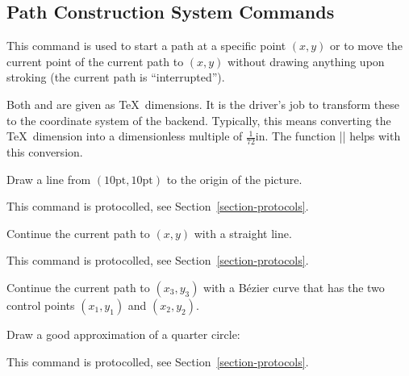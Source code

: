 \subsection{Path Construction System Commands}

\begin{command}{\pgfsys@moveto{}}
  This command is used to start a path at a specific point
  $(x,y)$ or to move the current point of the current path to  $(x,y)$
  without drawing anything upon stroking (the current path is
  ``interrupted'').

  Both  and  are given as \TeX\ dimensions. It is the
  driver's job to transform these to the coordinate system of the
  backend. Typically, this means converting the \TeX\ dimension into a
  dimensionless multiple of $\frac{1}{72}\mathrm{in}$. The function
  |\pgf@sys@bp| helps with this conversion.

  \example Draw a line from $(10\mathrm{pt},10\mathrm{pt})$ to the
  origin of the picture.
\begin{codeexample}
\pgfsys@moveto{10pt}{10pt}
\pgfsys@lineto{0pt}{0pt}
\pgfsys@stroke
\end{codeexample}

  This command is protocolled, see Section~\ref{section-protocols}.
\end{command}


\begin{command}{\pgfsys@lineto{}}
  Continue the current path to $(x,y)$ with
  a straight line.

  This command is protocolled, see Section~\ref{section-protocols}.
\end{command}


\begin{command}{\pgfsys@curveto{}}
  Continue the current path to $(x_3,y_3)$
  with a B\'ezier curve that has the two control points  $(x_1,y_1)$ and  $(x_2,y_2)$.

  \example Draw a good approximation of a quarter circle:
\begin{codeexample}
\pgfsys@moveto{10pt}{0pt}
\pgfsys@curveto{10pt}{5.55pt}{5.55pt}{10pt}{0pt}{10pt}
\pgfsys@stroke
\end{codeexample}

  This command is protocolled, see Section~\ref{section-protocols}.
\end{command}



